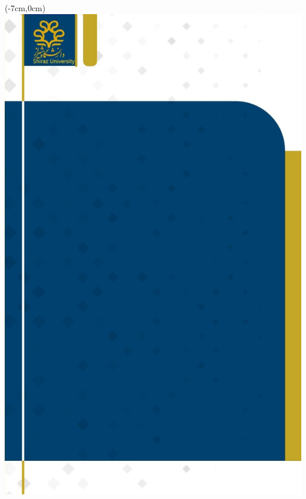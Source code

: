 \begin{textblock*}{\paperheight}(-7cm,0cm)
    \includegraphics[width=\paperwidth,height=\paperheight]{assets/back_cover}
\end{textblock*}

